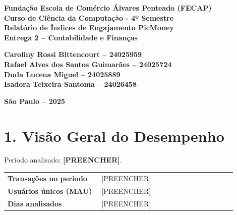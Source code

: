 \documentclass[12pt]{article}
\providecommand{\Periodo}{[PREENCHER]}
\providecommand{\TransacoesPeriodo}{[PREENCHER]}
\providecommand{\UsuariosUnicos}{[PREENCHER]}
\providecommand{\DiasAnalisados}{[PREENCHER]}
\begin{document}

\begin{center}
\textbf{Fundação Escola de Comércio Álvares Penteado (FECAP)}\\
\textbf{Curso de Ciência da Computação - 4º Semestre}\\[2cm]

\vspace*{\fill}
\textbf{\Large Relatório de Índices de Engajamento PicMoney}\\[0.5cm]
\textbf{Entrega 2 – Contabilidade e Finanças}\\[2cm]
\end{center}

\noindent\hspace*{6cm}\textbf{Caroliny Rossi Bittencourt – 24025959}\\
\hspace*{6cm}\textbf{Rafael Alves dos Santos Guimarães – 24025724}\\
\hspace*{6cm}\textbf{Duda Lucena Miguel – 24025889}\\
\hspace*{6cm}\textbf{Isadora Teixeira Santoma – 24026458}\\[2cm]

\vspace*{\fill}
\begin{center}
\vfill
\textbf{São Paulo – 2025}
\end{center}
\newpage
\onehalfspacing

\section*{1. Visão Geral do Desempenho}
Período analisado: \textbf{\Periodo}.

\begin{center}
\begin{tabular}{>{\bfseries}p{0.37\linewidth} p{0.53\linewidth}}
\toprule
Transações no período & \TransacoesPeriodo \\
Usuários únicos (MAU) & \UsuariosUnicos \\
Dias analisados & \DiasAnalisados \\
\bottomrule
\end{tabular}
\end{center}
\end{document}
